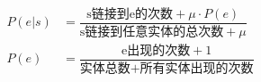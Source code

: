\begin{align*} P(e|s) &= \dfrac{\textrm{s链接到e的次数}+\mu \cdot P(e)}{\textrm{s链接到任意实体的总次数} + \mu} \\ P(e) &= \dfrac{\textrm{e出现的次数} + 1}{\textrm{实体总数} + \textrm{所有实体出现的次数}} \end{align*}